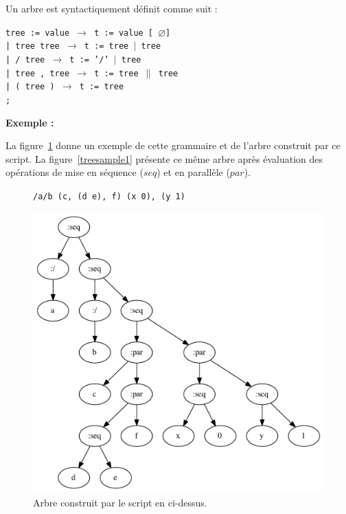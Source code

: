 \documentclass{article}
\newcommand{\exemple}	{\vspace*{1mm}\hspace*{-4mm}\textbf{Exemple :}}
\newcommand{\code}	[2][0.9]		{\vspace{0mm}\begin{center}\colorbox{mygrey}{
							\begin{minipage}[t]{#1\columnwidth} 
							{\small \texttt{#2}}
							\end{minipage}}\end{center}}
\newcommand{\nulltree}	{\ensuremath{\varnothing}}
\newcommand{\seq}		{\ensuremath{|}}
\newcommand{\paral}		{\ensuremath{\parallel}}
\newcommand{\ula}		{\hspace*{8mm}}
\begin{document}
Un arbre est syntactiquement définit comme suit :
\code{tree := value      \hspace*{8mm} $\to$ t := value [ \nulltree ] \\
\ula | tree tree         \hspace*{4mm} $\to$ t := tree \seq\ tree \\
\ula | / tree            \hspace*{9.7mm} $\to$ t := '/' \seq\ tree\\
\ula | tree , tree       \hspace*{0mm}  $\to$ t := tree \paral\ tree \\
\ula | ( tree )          \hspace*{6mm} $\to$ t := tree \\
\ula ;\\
}

\exemple

La figure~\ref{parsesample1} donne un exemple de cette grammaire et de l'arbre construit par ce script. La figure~\ref{treesample1} présente ce même arbre après évaluation des opérations de mise en séquence ($seq$) et en parallèle ($par$).

\begin{figure}[htbp]
\code{/a/b (c, (d e), f) (x 0), (y 1)}
\begin{center}
\includegraphics[width=0.9\columnwidth]{parse/sample1}
\caption{Arbre construit par le script en ci-dessus.}
\label{parsesample1}
\end{center}
\end{figure}
\end{document}

